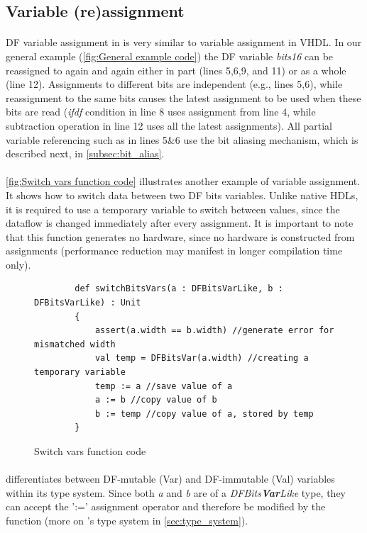 \newpage
\subsection{Variable (re)assignment}
\label{subsec:var_assign}
\paragraph{}DF variable assignment in \cf is very similar to variable assignment in VHDL. In our general example (\autoref{fig:General example code}) the DF variable \textit{bits16} can be reassigned to again and again either in part (lines 5,6,9, and 11) or as a whole (line 12). Assignments to different bits are independent (e.g., lines 5,6), while reassignment to the same bits causes the latest assignment to be used when these bits are read (\textit{ifdf} condition in line 8 uses assignment from line 4, while subtraction operation in line 12 uses all the latest assignments). All partial variable referencing such as in lines 5\&6 use the bit aliasing mechanism, which is described next, in \autoref{subsec:bit_alias}.
\paragraph{}\autoref{fig:Switch vars function code} illustrates another example of variable assignment. It shows how to switch data between two DF bits variables. Unlike native HDLs, it is required to use a temporary variable to switch between values, since the dataflow is changed immediately after every assignment. It is important to note that this function generates no hardware, since no hardware is constructed from assignments (performance reduction may manifest in longer compilation time only). 
\begin{figure}[h]
	\centering
	\begin{verbatim}
		def switchBitsVars(a : DFBitsVarLike, b : DFBitsVarLike) : Unit
		{
			assert(a.width == b.width) //generate error for mismatched width
			val temp = DFBitsVar(a.width) //creating a temporary variable
			temp := a //save value of a
			a := b //copy value of b
			b := temp //copy value of a, stored by temp
		}
	\end{verbatim}
	\caption{Switch vars function code}\label{fig:Switch vars function code}
\end{figure}
\paragraph{}\cf differentiates between DF-mutable (Var) and DF-immutable (Val) variables within its type system. Since both \textit{a} and \textit{b} are of a \textit{DFBits\textbf{Var}Like} type, they can accept the ':=' assignment operator and therefore be modified by the function (more on \cfns's type system in \autoref{sec:type_system}). 
